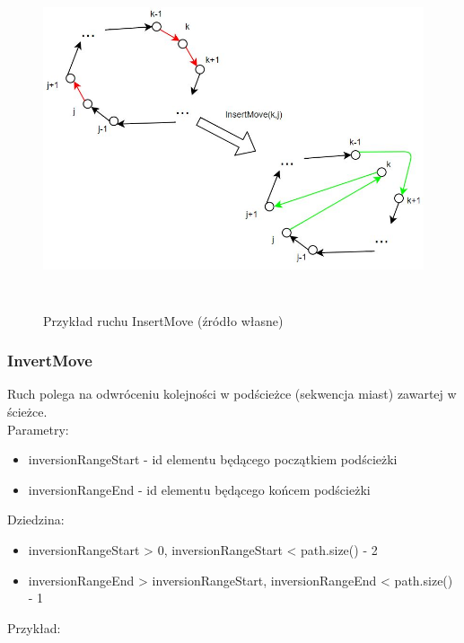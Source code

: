 \documentclass[a4paper,11pt]{article}
\begin{document}
\begin{figure}[H]
\centering
\includegraphics[height=10cm]{InsertMove.JPG}
\caption{Przykład ruchu InsertMove (źródło własne)}
\end{figure}
\newpage

\subsubsection{InvertMove}
Ruch polega na odwróceniu kolejności w podścieżce (sekwencja miast) zawartej w ścieżce.\\[0.3cm]
Parametry: 
\begin{itemize}
\item inversionRangeStart - id elementu będącego początkiem podścieżki
\item inversionRangeEnd - id elementu będącego końcem podścieżki
\end{itemize}
Dziedzina: 
\begin{itemize}
\item inversionRangeStart > 0, inversionRangeStart < path.size() - 2
\item inversionRangeEnd > inversionRangeStart, inversionRangeEnd < path.size() - 1

\end{itemize}
Przykład:
\end{document}
